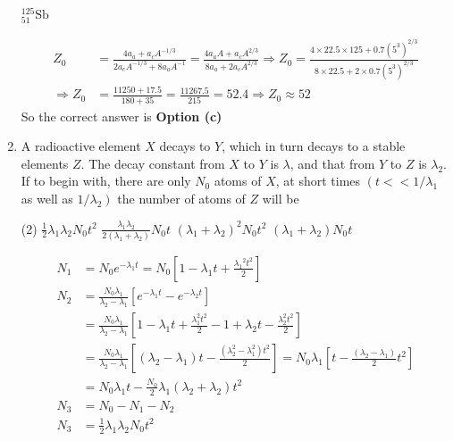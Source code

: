 \begin{enumerate}
\begin{tasks}
		\task[\textbf{d.}] ${ }_{51}^{125} \mathrm{Sb}$
	\end{tasks}
\begin{answer}
	$$
	\begin{aligned}
	Z_0&=\frac{4 a_a+a_c A^{-1 / 3}}{2 a_c A^{-1 / 3}+8 a_a A^{-1}}=\frac{4 a_a A+a_c A^{2 / 3}}{8 a_a+2 a_c A^{2 / 3}} \Rightarrow Z_0=\frac{4 \times 22.5 \times 125+0.7\left(5^3\right)^{2 / 3}}{8 \times 22.5+2 \times 0.7\left(5^3\right)^{2 / 3}}\\
	\Rightarrow Z_0&=\frac{11250+17.5}{180+35}=\frac{11267.5}{215}=52.4 \Rightarrow Z_0 \approx 52
\end{aligned}
$$
	So the correct answer is \textbf{Option (c)}
\end{answer}
	\item A radioactive element $X$ decays to $Y$, which in turn decays to a stable elements $Z$. The decay constant from $X$ to $Y$ is $\lambda$, and that from $Y$ to $Z$ is $\lambda_2$. If to begin with, there are only $N_0$ atoms of $X$, at short times $\left(t<<1 / \lambda_1\right.$ as well as $\left.1 / \lambda_2\right)$ the number of atoms of $Z$ will be
 \begin{tasks}(2)
	\task[\textbf{a.}]$\frac{1}{2} \lambda_1 \lambda_2 N_0 t^2$
	\task[\textbf{b.}] $\frac{\lambda_1 \lambda_2}{2\left(\lambda_1+\lambda_2\right)} N_0 t$
	\task[\textbf{c.}]$\left(\lambda_1+\lambda_2\right)^2 N_0 t^2$
	\task[\textbf{d.}] $\left(\lambda_1+\lambda_2\right) N_0 t$
\end{tasks}
\begin{answer}
	$$
	\begin{aligned}
	N_1&=N_0 e^{-\lambda_1 t}=N_0\left[1-\lambda_1 t+\frac{\lambda_1{ }^2 t^2}{2}\right]\\
	N_2&=\frac{N_0 \lambda_1}{\lambda_2-\lambda_1}\left[e^{-\lambda_1 t}-e^{-\lambda_2 t}\right] \\
	&=\frac{N_0 \lambda_1}{\lambda_2-\lambda_1}\left[1-\lambda_1 t+\frac{\lambda_1^2 t^2}{2}-1+\lambda_2 t-\frac{\lambda_2^2 t^2}{2}\right] \\
	&=\frac{N_0 \lambda_1}{\lambda_2-\lambda_1}\left[\left(\lambda_2-\lambda_1\right) t-\frac{\left(\lambda_2^2-\lambda_1^2\right) t^2}{2}\right]=N_0 \lambda_1\left[t-\frac{\left(\lambda_2-\lambda_1\right)}{2} t^2\right] \\
	&=N_0 \lambda_1 t-\frac{N_0}{2} \lambda_1\left(\lambda_2+\lambda_2\right) t^2\\
	N_3&=N_0-N_1-N_2 \\
	N_3&=\frac{1}{2} \lambda_1 \lambda_2 N_0 t^2
\end{aligned}
$$
\end{answer}
\end{enumerate}
